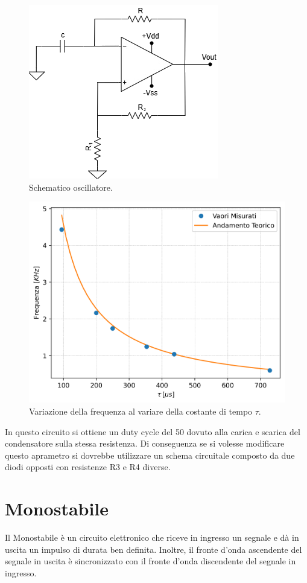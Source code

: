 \documentclass[a4paper,12pt]{article}
\begin{document}
\begin{figure}[h]
    \centering
    \includegraphics[width=0.4\linewidth]{immagini/ocillatore/circuito.png}
    \caption{Schematico oscillatore.}
    \label{fig:schematico_oscillatore}
\end{figure}

\begin{figure}[h]
    \centering
    \includegraphics[width=0.6\linewidth]{immagini/ocillatore/freq_tau.png}
    \caption{Variazione della frequenza al variare della costante di tempo $\tau$.}
    \label{fig:ocillatore_freq_tau}
\end{figure}

In questo circuito si ottiene un duty cycle del 50 dovuto alla carica e scarica del condensatore sulla stessa resistenza. Di conseguenza se si volesse modificare questo aprametro si dovrebbe utilizzare un schema circuitale composto da due diodi opposti con resistenze R3 e R4 diverse.

\section*{Monostabile}
Il Monostabile è un circuito elettronico che riceve in ingresso un segnale e dà in uscita un impulso di durata ben definita. 
Inoltre, il fronte d'onda ascendente del segnale in uscita è sincronizzato con il fronte d'onda discendente del segnale in ingresso.
\end{document}
